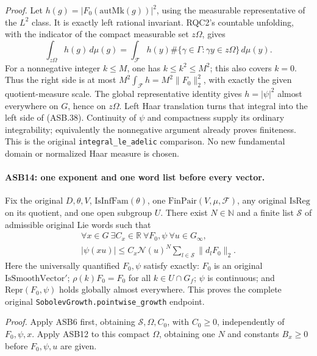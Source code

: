 \emph{Proof.}
Let \(h(g)=|F_0(\mathrm{autMk}(g))|^2\), using the measurable
representative of the \(L^2\) class.  It is exactly left rational
invariant.  RQC2's countable unfolding, with the indicator of
the compact measurable set \(z\Omega\), gives
\[
 \int_{z\Omega}h(g)\,d\mu(g)
  =\int_{\mathcal F}h(y)
           \#\{\gamma\in\Gamma:\gamma y\in z\Omega\}\,d\mu(y).
 \tag{ASB.39}
\]
For a nonnegative integer \(k\le M\), one has
\(k\le k^2\le M^2\); this also covers \(k=0\).
Thus the right side is at most
\(M^2\int_{\mathcal F}h=M^2\|F_0\|_2^2\), with exactly the
given quotient-measure scale.
The global representative identity gives \(h=|\psi|^2\)
almost everywhere on \(G\), hence on \(z\Omega\).
Left Haar translation turns that integral into the left side of
(ASB.38).  Continuity of \(\psi\) and compactness supply its
ordinary integrability; equivalently the nonnegative argument
already proves finiteness.
This is the original \texttt{integral\_le\_adelic} comparison.
No new fundamental domain or normalized Haar measure is chosen.

\paragraph{ASB14: one exponent and one word list before every vector.}
\label{claim:ASB14}
Fix the original \(D,\theta,V\), \(\mathrm{IsInfFam}(\theta)\),
one \(\mathrm{FinPair}(V,\mu,\mathcal F)\), any original
\(\mathrm{IsReg}\) on its quotient, and one open subgroup \(U\).
There exist \(N\in\mathbb N\) and a finite list \(\mathcal S\)
of admissible original Lie words such that
\[
 \begin{gathered}
 \forall x\in G\ \exists C_x\in\mathbb R\
 \forall F_0,\psi\
 \forall u\in G_\infty,\\
 |\psi(xu)|\le
        C_x\mathcal N(u)^N\sum_{l\in\mathcal S}\|d_lF_0\|_2 .
 \end{gathered}
 \tag{ASB.40}
\]
Here the universally quantified \(F_0,\psi\) satisfy exactly:
\(F_0\) is an original \(\mathrm{IsSmoothVector}'\);
\(\rho(k)F_0=F_0\) for all \(k\in U\cap G_f\);
\(\psi\) is continuous; and \(\mathrm{Repr}(F_0,\psi)\) holds
globally almost everywhere.
This proves the complete original
\texttt{SobolevGrowth.pointwise\_growth} endpoint.

\emph{Proof.}
Apply ASB6 first, obtaining \(\mathcal S,\Omega,C_0\), with
\(C_0\ge0\), independently of \(F_0,\psi,x\).
Apply ASB12 to this compact \(\Omega\), obtaining one \(N\)
and constants \(B_x\ge0\) before \(F_0,\psi,u\) are given.

